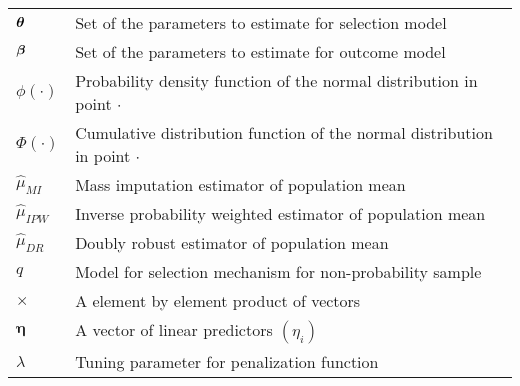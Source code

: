 \documentclass[
  letterpaper,
  DIV=11,
  numbers=noendperiod]{scrreprt}
\begin{document}
\begin{longtable}[]{@{}
  >{\raggedright\arraybackslash}p{}
  >{\raggedright\arraybackslash}p{}@{}}
\(\boldsymbol{\theta}\) & Set of the parameters to estimate for selection model \\
\(\boldsymbol{\beta}\) & Set of the parameters to estimate for outcome model \\
\(\phi(\cdot)\) & Probability density function of the normal
distribution in point \(\cdot\) \\
\(\Phi(\cdot)\) & Cumulative distribution function of the normal
distribution in point \(\cdot\) \\
\(\hat{\mu}_{MI}\) & Mass imputation estimator of population mean \\
\(\hat{\mu}_{IPW}\) & Inverse probability weighted estimator of
population mean \\
\(\hat{\mu}_{DR}\) & Doubly robust estimator of population mean \\
\(q\) & Model for selection mechanism for non-probability sample \\
\(\times\) & A element by element product of vectors \\
\(\boldsymbol{\eta}\) & A vector of linear predictors \((\eta_{i})\) \\
\(\lambda\) & Tuning parameter for penalization function \\
\bottomrule()
\end{longtable}
\end{document}
